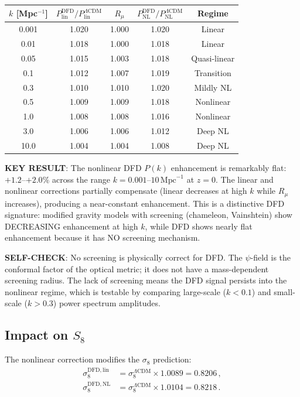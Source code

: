 \documentclass[11pt,a4paper]{article}
\begin{document}
\begin{center}
\begin{longtable}{ccccc}
\toprule
$k$ [Mpc$^{-1}$] & $P^{\mathrm{DFD}}_{\mathrm{lin}}/P^{\Lambda\mathrm{CDM}}_{\mathrm{lin}}$ & $R_\mu$ & $P^{\mathrm{DFD}}_{\mathrm{NL}}/P^{\Lambda\mathrm{CDM}}_{\mathrm{NL}}$ & Regime \\
\midrule
0.001 & 1.020 & 1.000 & 1.020 & Linear \\
0.01 & 1.018 & 1.000 & 1.018 & Linear \\
0.05 & 1.015 & 1.003 & 1.018 & Quasi-linear \\
0.1 & 1.012 & 1.007 & 1.019 & Transition \\
0.3 & 1.010 & 1.010 & 1.020 & Mildly NL \\
0.5 & 1.009 & 1.009 & 1.018 & Nonlinear \\
1.0 & 1.008 & 1.008 & 1.016 & Nonlinear \\
3.0 & 1.006 & 1.006 & 1.012 & Deep NL \\
10.0 & 1.004 & 1.004 & 1.008 & Deep NL \\
\bottomrule
\end{longtable}
\end{center}

\textbf{KEY RESULT}: The nonlinear DFD $P(k)$ enhancement is remarkably flat: $+1.2$--$+2.0\%$ across the range $k = 0.001$--$10\,\mathrm{Mpc}^{-1}$ at $z = 0$. The linear and nonlinear corrections partially compensate (linear decreases at high $k$ while $R_\mu$ increases), producing a near-constant enhancement. This is a distinctive DFD signature: modified gravity models with screening (chameleon, Vainshtein) show DECREASING enhancement at high $k$, while DFD shows nearly flat enhancement because it has NO screening mechanism.

\textbf{SELF-CHECK}: No screening is physically correct for DFD. The $\psi$-field is the conformal factor of the optical metric; it does not have a mass-dependent screening radius. The lack of screening means the DFD signal persists into the nonlinear regime, which is testable by comparing large-scale ($k < 0.1$) and small-scale ($k > 0.3$) power spectrum amplitudes.

\subsection{Impact on $S_8$}

The nonlinear correction modifies the $\sigma_8$ prediction:
\begin{align}
\sigma_8^{\mathrm{DFD,lin}} &= \sigma_8^{\Lambda\mathrm{CDM}} \times 1.0089 = 0.8206\,, \\
\sigma_8^{\mathrm{DFD,NL}} &= \sigma_8^{\Lambda\mathrm{CDM}} \times 1.0104 = 0.8218\,.
\end{align}
\end{document}
